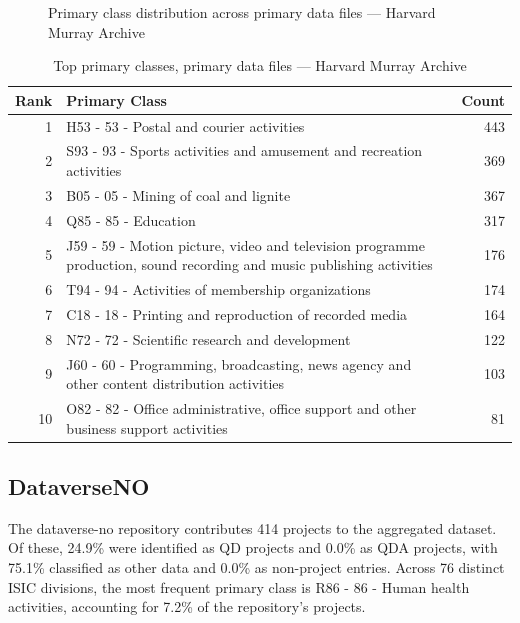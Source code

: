 \clearpage

\begin{figure}[H]
    \centering
    
    \caption{Primary class distribution across primary data files --- Harvard Murray Archive}
\end{figure}

\begin{table}[H]
    \centering
    \begin{tabular}{r p{10cm} r}
    \hline
    \textbf{Rank} & \textbf{Primary Class} & \textbf{Count} \\
    \hline
    1 & H53 - 53 - Postal and courier activities & 443 \\
    2 & S93 - 93 - Sports activities and amusement and recreation activities & 369 \\
    3 & B05 - 05 - Mining of coal and lignite & 367 \\
    4 & Q85 - 85 - Education & 317 \\
    5 & J59 - 59 - Motion picture, video and television programme production, sound recording and music publishing activities & 176 \\
    6 & T94 - 94 - Activities of membership organizations & 174 \\
    7 & C18 - 18 - Printing and reproduction of recorded media & 164 \\
    8 & N72 - 72 - Scientific research and development & 122 \\
    9 & J60 - 60 - Programming, broadcasting, news agency and other content distribution activities & 103 \\
    10 & O82 - 82 - Office administrative, office support and other business support activities & 81 \\
    \hline
    \end{tabular}
    \caption{Top primary classes, primary data files --- Harvard Murray Archive}
\end{table}

\clearpage

\subsection{DataverseNO}


The dataverse-no repository contributes 414 projects to the aggregated dataset. Of these, 24.9\% were identified as QD projects and 0.0\% as QDA projects, with 75.1\% classified as other data and 0.0\% as non-project entries. Across 76 distinct ISIC divisions, the most frequent primary class is R86 - 86 - Human health activities, accounting for 7.2\% of the repository's projects.


